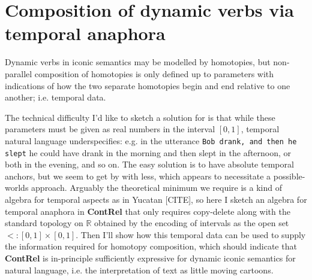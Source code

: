 \section{Composition of dynamic verbs via temporal anaphora}
Dynamic verbs in iconic semantics may be modelled by homotopies, but non-parallel composition of homotopies is only defined up to parameters with indications of how the two separate homotopies begin and end relative to one another; i.e. temporal data.

\begin{example}

\end{example}

The technical difficulty I'd like to sketch a solution for is that while these parameters must be given as real numbers in the interval $[0,1]$, temporal natural language underspecifies: e.g. in the utterance \texttt{Bob drank, and then he slept} he could have drank in the morning and then slept in the afternoon, or both in the evening, and so on. The easy solution is to have absolute temporal anchors, but we seem to get by with less, which appears to necessitate a possible-worlds approach. Arguably the theoretical minimum we require is a kind of algebra for temporal aspects as in Yucatan [CITE], so here I sketch an algebra for temporal anaphora in \textbf{ContRel} that only requires copy-delete along with the standard topology on $\mathbb{R}$ obtained by the encoding of intervals as the open set $<: [0,1] \times [0,1]$. Then I'll show how this temporal data can be used to supply the information required for homotopy composition, which should indicate that \textbf{ContRel} is in-principle sufficiently expressive for dynamic iconic semantics for natural language, i.e. the interpretation of text as little moving cartoons.

